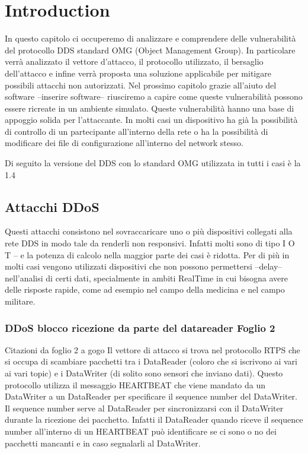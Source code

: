 \chapter{Introduction}


In questo capitolo ci occuperemo di analizzare e comprendere delle vulnerabilità
del protocollo DDS standard OMG (Object Management Group). In particolare
verrà analizzato il vettore d'attacco, il protocollo utilizzato, il bersaglio
dell'attacco e infine verrà proposta una soluzione applicabile per
mitigare possibili attacchi non autorizzati. Nel prossimo capitolo grazie all'aiuto
del software --inserire software-- riusciremo a capire come queste vulnerabilità
possono essere ricreate in un ambiente simulato.
Queste vulnerabilità hanno una base di appoggio solida per 
l'attaccante. In molti casi un dispositivo ha già la possibilità di controllo
di un partecipante all'interno della rete o ha la possibilità di modificare
dei file di configurazione all'interno del network stesso.

Di seguito la versione del DDS con lo standard OMG utilizzata in tutti i casi è
la 1.4




\section{Attacchi DDoS}
Questi attacchi consistono nel sovraccaricare uno o più dispositivi collegati alla 
rete DDS in modo tale da renderli non responsivi. Infatti molti sono di tipo 
I O T -- e la potenza di calcolo nella maggior parte dei casi è ridotta.
Per di più in molti casi vengono utilizzati dispositivi
che non possono permettersi --delay-- nell'analisi di certi dati, specialmente in
ambiti RealTime in cui bisogna avere delle risposte rapide, come ad esempio
nel campo della medicina e nel campo militare.


\subsection{DDoS blocco ricezione da parte del datareader Foglio 2}

Citazioni da foglio 2 a gogo
Il vettore di attacco si trova nel protocollo RTPS che
si occupa di scambiare pacchetti tra i DataReader (coloro che si iscrivono ai vari
ai vari topic) e i DataWriter (di solito sono sensori che inviano dati).
Questo protocollo utilizza il messaggio HEARTBEAT che viene mandato da un DataWriter
a un DataReader per specificare il sequence number del DataWriter.
Il sequence number serve al DataReader per sincronizzarsi con il DataWriter 
durante la ricezione dei pacchetto.
Infatti il DataReader quando riceve il sequence number all'interno di un HEARTBEAT
può identificare se ci sono o no dei pacchetti mancanti e in caso segnalarli al
DataWriter.


